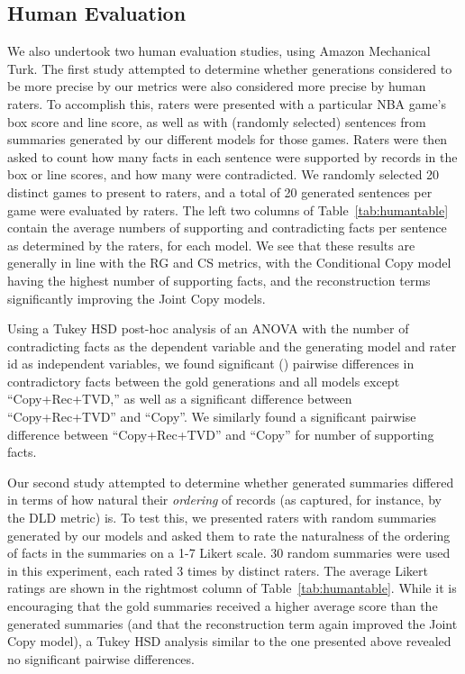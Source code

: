\documentclass[11pt,letterpaper]{article}
\begin{document}
\subsection{Human Evaluation}
We also undertook two human evaluation studies, using Amazon Mechanical Turk. The first study attempted to determine whether generations considered to be more precise by our metrics were also considered more precise by human raters. To accomplish this, raters were presented with a particular NBA game's box score and line score, as well as with (randomly selected) sentences from summaries generated by our different models for those games. Raters were then asked to count how many facts in each sentence were supported by records in the box or line scores, and how many were contradicted. We randomly selected 20 distinct games to present to raters, and a total of 20 generated sentences per game were evaluated by raters. The left two columns of Table~\ref{tab:humantable} contain the average numbers of supporting and contradicting facts per sentence as determined by the raters, for each model. We see that these results are generally in line with the RG and CS metrics, with the Conditional Copy model having the highest number of supporting facts, and the reconstruction terms significantly improving the Joint Copy models.

Using a Tukey HSD post-hoc analysis of an ANOVA with the number of contradicting facts as the dependent variable and the generating model and rater id as independent variables, we found significant () pairwise differences in contradictory facts between the gold generations and all models except ``Copy+Rec+TVD,'' as well as a significant difference between ``Copy+Rec+TVD'' and ``Copy''. We similarly found a significant pairwise difference between ``Copy+Rec+TVD'' and ``Copy'' for number of supporting facts.

Our second study attempted to determine whether generated summaries differed in terms of how natural their \textit{ordering} of records (as captured, for instance, by the DLD metric) is. To test this, we presented raters with random summaries generated by our models and asked them to rate the naturalness of the ordering of facts in the summaries on a 1-7 Likert scale. 30 random summaries were used in this experiment, each rated 3 times by distinct raters. The average Likert ratings are shown in the rightmost column of Table~\ref{tab:humantable}. While it is encouraging that the gold summaries received a higher average score than the generated summaries (and that the reconstruction term again improved the Joint Copy model), a Tukey HSD analysis similar to the one presented above revealed no significant pairwise differences.
\end{document}
